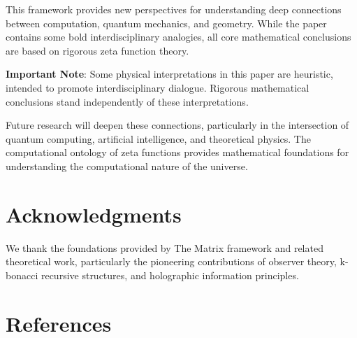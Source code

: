 \documentclass[11pt]{article}
\begin{document}
This framework provides new perspectives for understanding deep connections between computation, quantum mechanics, and geometry. While the paper contains some bold interdisciplinary analogies, all core mathematical conclusions are based on rigorous zeta function theory.

\textbf{Important Note}: Some physical interpretations in this paper are heuristic, intended to promote interdisciplinary dialogue. Rigorous mathematical conclusions stand independently of these interpretations.

Future research will deepen these connections, particularly in the intersection of quantum computing, artificial intelligence, and theoretical physics. The computational ontology of zeta functions provides mathematical foundations for understanding the computational nature of the universe.

\section*{Acknowledgments}

We thank the foundations provided by The Matrix framework and related theoretical work, particularly the pioneering contributions of observer theory, k-bonacci recursive structures, and holographic information principles.

\section*{References}
\end{document}

